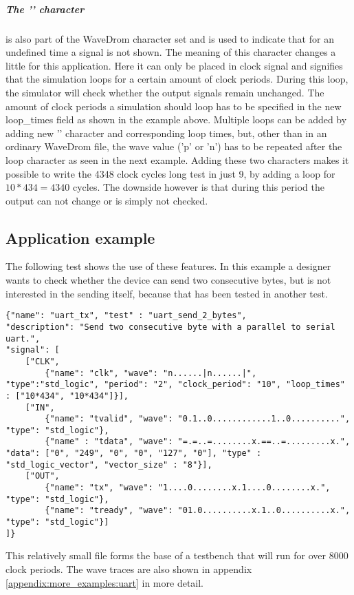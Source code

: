 \subparagraph{The '\textbar' character} is also part of the WaveDrom character set and is used to indicate that for an undefined time a signal is not shown. The meaning of this character changes a little for this application. Here it can only be placed in clock signal and signifies that the simulation loops for a certain amount of clock periods. During this loop, the simulator will check whether the output signals remain unchanged. The amount of clock periods a simulation should loop has to be specified in the new loop\_times field as shown in the example above. Multiple loops can be added by adding new '\textbar' character and corresponding loop times, but, other than in an ordinary WaveDrom file, the wave value ('p' or 'n') has to be repeated after the loop character as seen in the next example.
\npar
Adding these two characters makes it possible to write the 4348 clock cycles long test in just 9, by adding a loop for $10*434 = 4340$ cycles. The downside however is that during this period the output can not change or is simply not checked.
\newpage
\subsection{Application example}
The following test shows the use of these features. In this example a designer wants to check whether the device can send two consecutive bytes, but is not interested in the sending itself, because that has been tested in another test.
\begin{lstlisting}[style=json, caption={Source file for creating third transmission test for the UART design in \ref{appendix:uart}}, label={json:uart_2_bytes}]
{"name": "uart_tx", "test" : "uart_send_2_bytes", 
"description": "Send two consecutive byte with a parallel to serial uart.", 
"signal": [
	["CLK",
		{"name": "clk", "wave": "n......|n......|", "type":"std_logic", "period": "2", "clock_period": "10", "loop_times" : ["10*434", "10*434"]}],
	["IN",
		{"name": "tvalid", "wave": "0.1..0............1..0..........", "type": "std_logic"},
		{"name" : "tdata", "wave": "=.=..=........x.==..=.........x.", "data": ["0", "249", "0", "0", "127", "0"], "type" : "std_logic_vector", "vector_size" : "8"}],
	["OUT",
		{"name": "tx", "wave": "1....0........x.1....0........x.", "type": "std_logic"},
		{"name": "tready", "wave": "01.0..........x.1..0..........x.", "type": "std_logic"}]
]}
\end{lstlisting}\noindent
{}\nline
This relatively small file forms the base of a testbench that will run for over 8000 clock periods. The wave traces are also shown in appendix \ref{appendix:more_examples:uart} in more detail.
